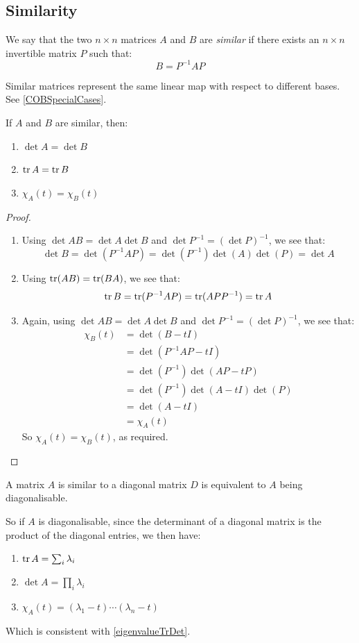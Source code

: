 \documentclass[../main.tex]{subfiles}
\begin{document}
\subsection{Similarity}
\begin{definition}
  We say that the two $n \times n$ matrices $A$ and $B$ are \textit{similar} if there exists an $n \times n$ invertible matrix $P$ such that:
  \[
    B = P^{-1}AP
  \]
\end{definition}
\begin{remark}
  Similar matrices represent the same linear map with respect to different bases.
  See \cref{COBSpecialCases}.
\end{remark}
\begin{proposition}
  If $A$ and $B$ are similar, then: \label{similarProperties}
  \begin{enumerate}
    \item $\det A = \det B$
    \item $\operatorname{tr} A= \operatorname{tr} B$
    \item $\chi_A(t) = \chi_B(t)$
  \end{enumerate}
\end{proposition}
\begin{proof}
  \begin{enumerate}
    \item Using $\det AB = \det A \det B$ and $\det P^{-1} = (\det P)^{-1}$, we see that:
      \[
        \det B = \det (P^{-1} A P) = \det (P^{-1}) \det (A) \det (P) = \det A
      \]
    \item Using $\operatorname{tr}(AB) = \operatorname{tr}(BA)$, we see that:
      \[
        \operatorname{tr} B = \operatorname{tr}(P^{-1} A P) = \operatorname{tr}(APP^{-1}) = \operatorname{tr} A
      \]
    \item Again, using $\det AB = \det A \det B$ and $\det P^{-1} = (\det P)^{-1}$, we see that:
      \begin{align*}
        \chi_B(t) &= \det(B - tI) \\
                  &= \det(P^{-1} A P - tI) \\
                  &= \det(P^{-1})\det(AP - tP) \\
                  &= \det(P^{-1})\det(A - tI)\det(P) \\
                  &= \det(A - tI) \\
                  &= \chi_A(t)
      \end{align*}
      So $\chi_A(t) = \chi_B(t)$, as required.
  \end{enumerate}
\end{proof}
\begin{remark}
  A matrix $A$ is similar to a diagonal matrix $D$ is equivalent to $A$ being diagonalisable.

  So if $A$ is diagonalisable, since the determinant of a diagonal matrix is the product of the diagonal entries, we then have:
  \begin{enumerate}
    \item $\operatorname{tr} A = \sum_{i} \lambda_i$
    \item $\det A = \prod_{i} \lambda_i$
    \item $\chi_A(t) = (\lambda_1 - t) \cdots(\lambda_n - t)$
  \end{enumerate}
  Which is consistent with \cref{eigenvalueTrDet}.
\end{remark}
\end{document}

